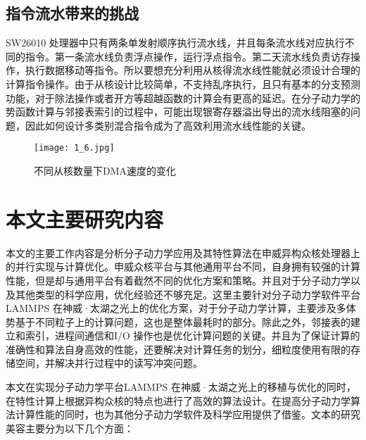 \subsection{指令流水带来的挑战}
SW26010 处理器中只有两条单发射顺序执行流水线，并且每条流水线对应执行不同的指令。第一条流水线负责浮点操作，运行浮点指令。第二天流水线负责访存操作，执行数据移动等指令。所以要想充分利用从核得流水线性能就必须设计合理的计算指令操作。由于从核设计比较简单，不支持乱序执行，且只有基本的分支预测功能，对于除法操作或者开方等超越函数的计算会有更高的延迟。在分子动力学的势函数计算与邻接表索引的过程中，可能出现银寄存器溢出导出的流水线阻塞的问题，因此如何设计多类别混合指令成为了高效利用流水线性能的关键。

 \begin{figure}[h]
  \centering
  \texttt{[image: 1\_6.jpg]}
  \caption{不同从核数量下DMA速度的变化}
  \label{fig:badge}
\end{figure}

\section{本文主要研究内容}
本文的主要工作内容是分析分子动力学应用及其特性算法在申威异构众核处理器上的并行实现与计算优化。申威众核平台与其他通用平台不同，自身拥有较强的计算性能，但是却与通用平台有着截然不同的优化方案和策略。并且对于分子动力学以及其他类型的科学应用，优化经验还不够充足。这里主要针对分子动力学软件平台LAMMPS 在神威·太湖之光上的优化方案，对于分子动力学计算，主要涉及多体势基于不同粒子上的计算问题，这也是整体最耗时的部分。除此之外，邻接表的建立和索引，进程间通信和I/O 操作也是优化计算问题的关键。并且为了保证计算的准确性和算法自身高效的性能，还要解决对计算任务的划分，细粒度使用有限的存储空间，并解决并行过程中的读写冲突问题。

本文在实现分子动力学平台LAMMPS 在神威·太湖之光上的移植与优化的同时，在特性计算上根据异构众核的特点也进行了高效的算法设计。在提高分子动力学算法计算性能的同时，也为其他分子动力学软件及科学应用提供了借鉴。文本的研究美容主要分为以下几个方面：

